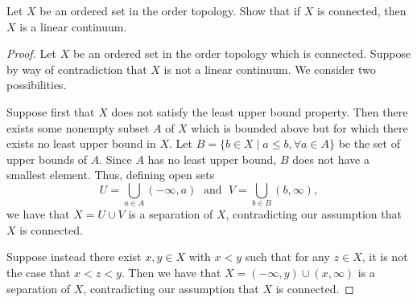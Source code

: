 \begin{exercise}[ID=3.24.4]
  Let $X$ be an ordered set in the order topology.
  Show that if $X$ is connected, then $X$ is a linear continuum.
\end{exercise}
%
\begin{solution}
  \begin{proof}
    Let $X$ be an ordered set in the order topology which is connected.
    Suppose by way of contradiction that $X$ is not a linear continuum.
    We consider two possibilities.

    Suppose first that $X$ does not satisfy the least upper bound property.
    Then there exists some nonempty subset $A$ of $X$ which is bounded above but for which there exists no least upper bound in $X$.
    Let $B = \{ b \in X \mid a \leq b, \forall a \in A \}$ be the set of upper bounds of $A$.
    Since $A$ has no least upper bound, $B$ does not have a smallest element.
    Thus, defining open sets
    \begin{equation}
      U = \bigcup_{a \in A} (-\infty, a) \; \text{ and }\; V = \bigcup_{b \in B} (b, \infty),
    \end{equation}
    we have that $X = U \cup V$ is a separation of $X$, contradicting our assumption that $X$ is connected.

    Suppose instead there exist $x, y \in X$ with $x < y$ such that for any $z \in X$, it is not the case that $x < z < y$.
    Then we have that $X = (-\infty, y) \cup (x, \infty)$ is a separation of $X$, contradicting our assumption that $X$ is connected.
  \end{proof}
\end{solution}
\newpage

